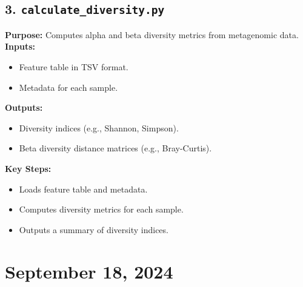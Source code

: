 \documentclass[11pt]{article}
\begin{document}
\subsection*{3. \texttt{calculate\_diversity.py}}
\textbf{Purpose:} Computes alpha and beta diversity metrics from metagenomic data. \\
\textbf{Inputs:}
\begin{itemize}
	\item Feature table in TSV format.
	\item Metadata for each sample.
\end{itemize}
\textbf{Outputs:}
\begin{itemize}
	\item Diversity indices (e.g., Shannon, Simpson).
	\item Beta diversity distance matrices (e.g., Bray-Curtis).
\end{itemize}
\textbf{Key Steps:}
\begin{itemize}
	\item Loads feature table and metadata.
	\item Computes diversity metrics for each sample.
	\item Outputs a summary of diversity indices.
\end{itemize}

\section*{September 18, 2024}
\end{document}
